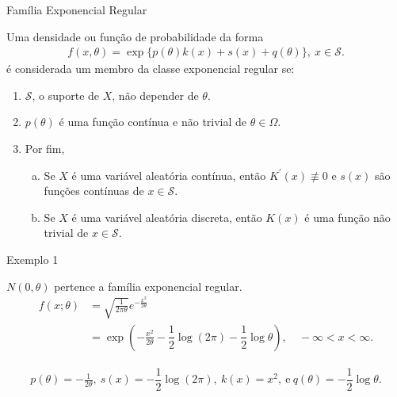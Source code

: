 \documentclass[12pt]{beamer}
\begin{document}
\begin{frame}{Família Exponencial Regular}
\begin{definicao}
\justifying
Uma densidade ou função de probabilidade da forma 
\begin{align*}
    f(x,\theta)=\exp{\{p(\theta)k(x)+s(x)+q(\theta)\}},~x\in \mathcal{S}.
\end{align*}
é considerada um membro da classe exponencial regular se:

\begin{enumerate}
\item $\mathcal{S}$, o suporte de $X$, não depender de $\theta$.
\item $p(\theta)$ é uma função contínua e não trivial de $\theta \in \Omega$.
\item Por fim,
\begin{enumerate}[(a)]
\item Se $X$ é uma variável aleatória contínua, então $K^{'}(x) \not \equiv 0$ e $s(x)$ são funções contínuas de $x \in \mathcal{S}$.
\item Se $X$ é uma variável aleatória discreta, então $K(x)$ é uma função não trivial de $x \in \mathcal{S}.$
\end{enumerate}
\end{enumerate}
\end{definicao}
\end{frame}

\begin{frame}{Exemplo 1}
\begin{block}{}
\justifying
$N(0,\theta)$ pertence a família exponencial regular. 
\begin{align*}
f(x; \theta) &= \sqrt{\frac{1}{2\pi\theta}} e^{-\frac{x^2}{2\theta}}\\ 
&= \exp\left(-\frac{x^2}{2\theta} - \dfrac{1}{2}\log{(2\pi)}-\dfrac{1}{2}\log{\theta}\right), \quad -\infty < x < \infty.
\end{align*}
\end{block}
\pause
\begin{block}{}
\justifying
\begin{align*}
p(\theta)=-\frac{1}{2\theta},~s(x)=-\dfrac{1}{2}\log{(2\pi)},~k(x)=x^{2},~\text{e}~q(\theta)=-\dfrac{1}{2}\log{\theta}.
\end{align*}
\end{block}
\end{frame}
\end{document}

